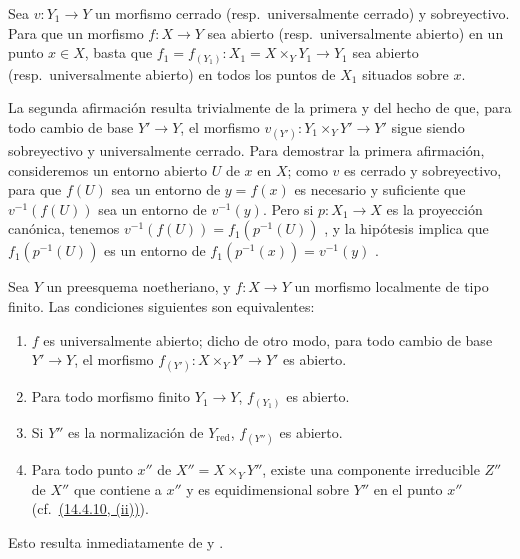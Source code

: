 \begin{lemma}[14.4.8.1]
\label{IV.14.4.8.1}
Sea $v:Y_1\to Y$ un morfismo cerrado \textup{(resp.}\ universalmente cerrado\textup{)} y sobreyectivo.
Para que un morfismo $f:X\to Y$ sea abierto \textup{(resp.}\ universalmente abierto\textup{)} en un punto $x\in X$, basta que $f_1=f_{(Y_1)}:X_1=X\times_Y Y_1\to Y_1$ sea abierto \textup{(resp.}\ universalmente abierto\textup{)} en todos los puntos de $X_1$ situados sobre $x$.
\end{lemma}

La segunda afirmación resulta trivialmente de la primera y del hecho de que, para todo cambio de base $Y'\to Y$, el morfismo $v_{(Y')}:Y_1\times_Y Y'\to Y'$ sigue siendo sobreyectivo y universalmente cerrado.
Para demostrar la primera afirmación, consideremos
un entorno abierto $U$ de $x$ en $X$; como $v$ es cerrado y sobreyectivo, para que $f(U)$ sea un entorno de $y=f(x)$ es necesario y suficiente que $v^{-1}(f(U))$ sea un entorno de $v^{-1}(y)$.
Pero si $p:X_1\to X$ es la proyección canónica, tenemos $v^{-1}(f(U))=f_1(p^{-1}(U))$ , y la hipótesis implica que $f_1(p^{-1}(U))$ es un entorno de $f_1(p^{-1}(x))=v^{-1}(y)$ .

\begin{corollary}[14.4.9]
\label{IV.14.4.9}
Sea $Y$ un preesquema noetheriano, y $f:X\to Y$ un morfismo localmente de tipo finito.
Las condiciones siguientes son equivalentes:
\begin{enumerate}[label=\emph{\alph*)}]
  \item $f$ es universalmente abierto; dicho de otro modo, para \textup{todo} cambio de base $Y'\to Y$, el morfismo $f_{(Y')}:X\times_Y Y'\to Y'$ es abierto.
  \item[\emph{a$'$)}] Para todo morfismo \textup{finito} $Y_1\to Y$, $f_{(Y_1)}$ es abierto.
  \item[\emph{a$''$)}] Si $Y''$ es la \textup{normalización} de $Y_{\mathrm{red}}$, $f_{(Y'')}$ es abierto.
  \item Para todo punto $x''$ de $X''=X\times_Y Y''$, existe una componente irreducible $Z''$ de $X''$ que contiene a $x''$ y es equidimensional sobre $Y''$ en el punto $x''$ \textup{(cf.\ {\hyperlink{ega4.c04.item.14-4-10}{(14.4.10, (ii))}})}.
\end{enumerate}
\end{corollary}

Esto resulta inmediatamente de  y .

